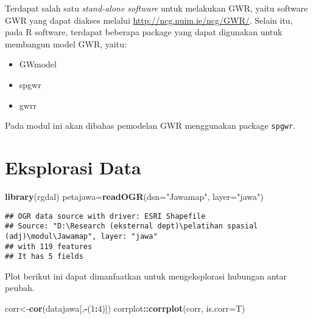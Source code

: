 \documentclass[
]{book}
\newenvironment{Shaded}{\begin{snugshade}}{\end{snugshade}}
\newcommand{\DataTypeTok}[1]{\textcolor[rgb]{0.13,0.29,0.53}{#1}}
\newcommand{\DecValTok}[1]{\textcolor[rgb]{0.00,0.00,0.81}{#1}}
\newcommand{\KeywordTok}[1]{\textcolor[rgb]{0.13,0.29,0.53}{\textbf{#1}}}
\newcommand{\NormalTok}[1]{#1}
\newcommand{\OperatorTok}[1]{\textcolor[rgb]{0.81,0.36,0.00}{\textbf{#1}}}
\newcommand{\StringTok}[1]{\textcolor[rgb]{0.31,0.60,0.02}{#1}}
\begin{document}
Terdapat salah satu \emph{stand-alone software} untuk melakukan GWR, yaitu software GWR yang dapat diakses melalui \url{http://ncg.nuim.ie/ncg/GWR/}. Selain itu, pada R software, terdapat beberapa package yang dapat digunakan untuk membangun model GWR, yaitu:

\begin{itemize}
\item
  GWmodel
\item
  spgwr
\item
  gwrr
\end{itemize}

Pada modul ini akan dibahas pemodelan GWR menggunakan package \texttt{spgwr}.

\hypertarget{eksplorasi-data-1}{%
\section{Eksplorasi Data}\label{eksplorasi-data-1}}

\begin{Shaded}
\begin{Highlighting}[]
\KeywordTok{library}\NormalTok{(rgdal)}
\NormalTok{petajawa=}\KeywordTok{readOGR}\NormalTok{(}\DataTypeTok{dsn=}\StringTok{"Jawamap"}\NormalTok{, }\DataTypeTok{layer=}\StringTok{"jawa"}\NormalTok{)}
\end{Highlighting}
\end{Shaded}

\begin{verbatim}
## OGR data source with driver: ESRI Shapefile 
## Source: "D:\Research (eksternal dept)\pelatihan spasial (adj)\modul\Jawamap", layer: "jawa"
## with 119 features
## It has 5 fields
\end{verbatim}

\begin{Shaded}
\end{Shaded}

Plot berikut ini dapat dimanfaatkan untuk mengeksplorasi hubungan antar peubah.

\begin{Shaded}
\begin{Highlighting}[]
\NormalTok{corr\textless{}{-}}\KeywordTok{cor}\NormalTok{(datajawa[,}\OperatorTok{{-}}\NormalTok{(}\DecValTok{1}\OperatorTok{:}\DecValTok{4}\NormalTok{)])}
\NormalTok{corrplot}\OperatorTok{::}\KeywordTok{corrplot}\NormalTok{(corr, }\DataTypeTok{is.corr=}\NormalTok{T)}
\end{Highlighting}
\end{Shaded}
\end{document}
